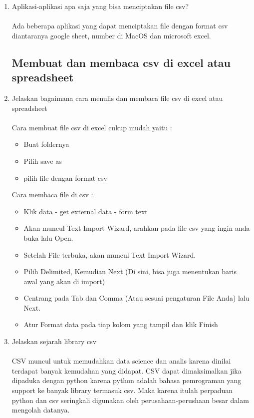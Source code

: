 \begin{enumerate}
\item Aplikasi-aplikasi apa saja yang bisa menciptakan ﬁle csv?
\paragraph{} Ada beberapa aplikasi yang dapat menciptakan file dengan format csv diantaranya google sheet, number di MacOS dan microsoft excel.
\subsection{Membuat dan membaca csv di excel atau spreadsheet}

\item Jelaskan bagaimana cara menulis dan membaca ﬁle csv di excel atau spreadsheet
\paragraph{} Cara membuat file csv di excel cukup mudah yaitu :
\begin{itemize}
	\item Buat foldernya
	\item Pilih save as
	\item pilih file dengan format csv
\end{itemize}
Cara membaca file di csv :
\begin{itemize}
	\item Klik data - get external data - form text
	\item Akan muncul Text Import Wizard, arahkan pada file csv yang ingin anda buka lalu Open.
	\item Setelah File terbuka, akan muncul Text Import Wizard.
	\item Pilih Delimited, Kemudian Next (Di sini, bisa juga menentukan baris awal yang akan di import)
	\item Centrang pada Tab dan Comma (Atau sesuai pengaturan File Anda) lalu Next.
	\item Atur Format data pada tiap kolom yang tampil dan klik Finish
\end{itemize}

\item Jelaskan sejarah library csv
\paragraph{} CSV muncul untuk memudahkan data science dan analis karena dinilai terdapat banyak kemudahan yang didapat. CSV dapat dimaksimalkan jika dipaduka dengan python karena python adalah bahasa pemrograman yang support ke banyak library termasuk csv. Maka karena itulah perpaduan python dan csv seringkali digunakan oleh perusahaan-perushaan besar dalam mengolah datanya.


\end{enumerate}
